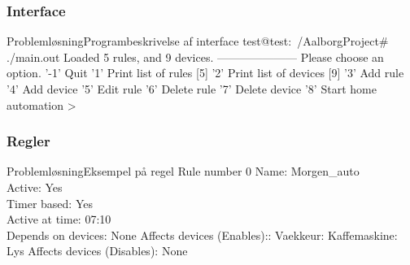 \subsubsection{Interface}
\begin{frame}{Problemløsning}{Programbeskrivelse af interface}
test@test:~/AalborgProject\# ./main.out \newline
Loaded 5 rules, and 9 devices.\newline
---------------------\newline
Please choose an option.\newline
  '-1' Quit\newline
  '1' Print list of rules [5]\newline
  '2' Print list of devices [9]\newline
  '3' Add rule\newline
  '4' Add device\newline
  '5' Edit rule\newline
  '6' Delete rule\newline
  '7' Delete device\newline
  '8' Start home automation\newline
>\newline
\end{frame}
\subsubsection{Regler}
\begin{frame}{Problemløsning}{Eksempel på regel}
Rule number 0 \newline
Name: Morgen\_auto\\
Active: Yes\\
Timer based: Yes\\
Active at time: 07:10\\
Depends on devices:\newline
    None\newline
Affects devices (Enables):: Vaekkeur: Kaffemaskine: Lys\newline
Affects devices (Disables):\newline
    None
\end{frame}
